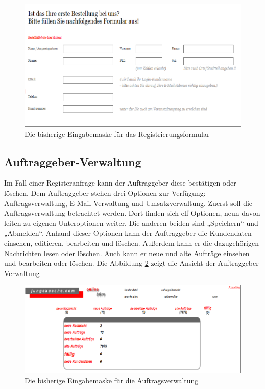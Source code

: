 \begin{figure}
	\centering
	\includegraphics[width=0.7\linewidth]{Graphics/registerForm.png}
	\caption[Registerformular]{Die bisherige Eingabemaske für das Registrierungsformular}
	\label{fig:registerForm}
\end{figure}

\subsection{Auftraggeber-Verwaltung}

Im Fall einer Registeranfrage kann der Auftraggeber diese bestätigen oder löschen. Dem Auftraggeber stehen drei Optionen zur Verfügung: Auftragsverwaltung, E-Mail-Verwaltung und Umsatzverwaltung. Zuerst soll die Auftragsverwaltung betrachtet werden. Dort finden sich elf Optionen, neun davon leiten zu eigenen Unteroptionen weiter. Die anderen beiden sind „Speichern“ und „Abmelden“. Anhand dieser Optionen kann der Auftraggeber die Kundendaten einsehen, editieren, bearbeiten und löschen. Außerdem kann er die dazugehörigen Nachrichten lesen oder löschen. Auch kann er neue und alte Aufträge einsehen und bearbeiten oder löschen. Die Abbildung \ref{fig:Auftragverwaltung} zeigt die Ansicht der Auftraggeber-Verwaltung

\begin{figure}[h]
	\centering
	\includegraphics[width=0.7\linewidth]{Graphics/Auftragverwaltung.png}
	\caption[Auftragsverwaltung]{Die bisherige Eingabemaske für die Auftragsverwaltung}
	\label{fig:Auftragverwaltung}
\end{figure}

